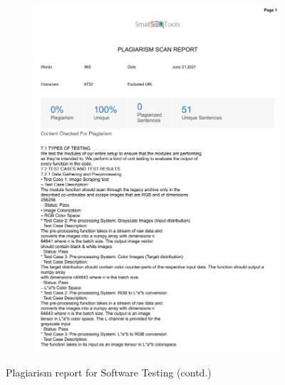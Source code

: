 \documentclass[oneside,a4paper,12pt]{report}
\begin{document}
\begin{appendices}
\begin{figure}
\begin{subfigure}[H]{\textwidth}
    	\includegraphics[scale=0.7, page=2]{plagiarism/software_testing.pdf}
    \end{subfigure}
    \caption{Plagiarism report for Software Testing (contd.)}
    \label{PlagiarismSoftwareTesting_1}
\end{figure}
\begin{figure}\ContinuedFloat
    \begin{subfigure}[H]{\textwidth}
    	\centering

\end{subfigure}
\end{figure}
\end{appendices}
\end{document}
